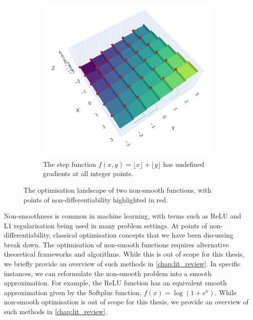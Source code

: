 \begin{figure}[h]
\begin{subfigure}[b]{0.48\linewidth}
        \includegraphics[width=\linewidth]{figures/2background/floor_func.png}
        \caption{The step function
        $f(x,y) = \lfloor x \rfloor + \lfloor y \rfloor$ has undefined gradients at all integer points.}
        \label{fig:step_function}
    \end{subfigure}
    \caption{The optimisation landscape of two non-smooth functions, with points of non-differentiability highlighted in red.}
    \label{fig:non_smooth_functions}
\end{figure}

Non-smoothness is common in machine learning, with terms such as ReLU and L1 regularisation being used in many problem settings. At points of non-differentiability, classical optimisation concepts that we have been discussing break down. The optimisation of non-smooth functions requires alternative theoretical frameworks and algorithms. While this is out of scope for this thesis, we briefly provide an overview of such methods in 
\cref{chap:lit_review}. In specific instances, we can reformulate the non-smooth problem into a smooth approximation. For example, the ReLU function has an equivalent smooth approximation given by the Softplus function, $f(x) = \log(1 + e^x)$. While non-smooth optimisation is out of scope for this thesis, we provide an overview of such methods in \cref{chap:lit_review}.


